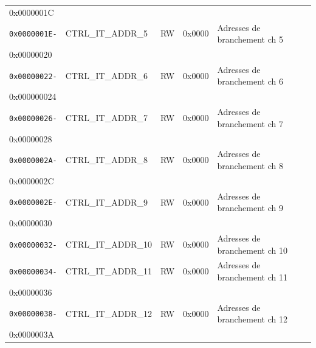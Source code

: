 \begin{table}[H]
\begin{tabular}{llllll}
		{0x0000001C}         &                        &               &                &                                      \\
		\rhline
		\texttt{0x0000001E-} & CTRL\_IT\_ADDR\_5      & RW            & 0x0000         & Adresses de branchement ch 5         \\
		{0x00000020}         &                        &               &                &                                      \\
		\rhline
		\texttt{0x00000022-} & CTRL\_IT\_ADDR\_6      & RW            & 0x0000         & Adresses de branchement ch 6         \\
		{0x000000024}        &                        &               &                &                                      \\
		\rhline
		\texttt{0x00000026-} & CTRL\_IT\_ADDR\_7      & RW            & 0x0000         & Adresses de branchement ch 7         \\
		{0x00000028}         &                        &               &                &                                      \\
		\rhline
		\texttt{0x0000002A-} & CTRL\_IT\_ADDR\_8      & RW            & 0x0000         & Adresses de branchement ch 8         \\
		{0x0000002C}         &                        &               &                &                                      \\
		\rhline
		\texttt{0x0000002E-} & CTRL\_IT\_ADDR\_9      & RW            & 0x0000         & Adresses de branchement ch 9         \\
		{0x00000030}         &                        &               &                &                                      \\
		\rhline
		\texttt{0x00000032-} & CTRL\_IT\_ADDR\_10     & RW            & 0x0000         & Adresses de branchement ch 10        \\
		\rhline
		\texttt{0x00000034-} & CTRL\_IT\_ADDR\_11     & RW            & 0x0000         & Adresses de branchement ch 11        \\
		{0x00000036}         &                        &               &                &                                      \\
		\rhline
		\texttt{0x00000038-} & CTRL\_IT\_ADDR\_12     & RW            & 0x0000         & Adresses de branchement ch 12        \\
		{0x0000003A}         &                        &               &                &                                      \\

\end{tabular}
\end{table}
